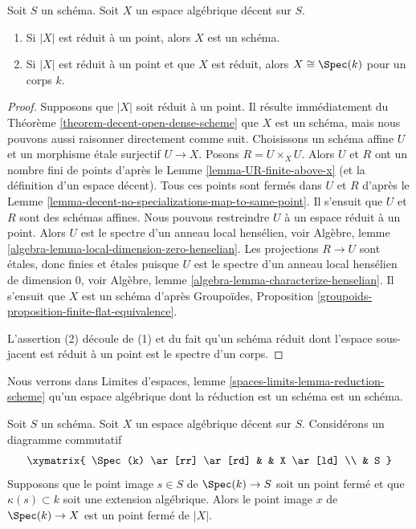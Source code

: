 \begin{lemma}
\label{lemma-when-field}
Soit $S$ un schéma. Soit $X$ un espace algébrique décent sur $S$.
\begin{enumerate}
\item Si $|X|$ est réduit à un point, alors $X$ est un schéma.
\item Si $|X|$ est réduit à un point et que $X$ est réduit, alors
$X \cong \Spec(k)$ pour un corps $k$.
\end{enumerate}
\end{lemma}

\begin{proof}
Supposons que $|X|$ soit réduit à un point. Il résulte immédiatement du
Théorème \ref{theorem-decent-open-dense-scheme} que $X$ est un schéma,
mais nous pouvons aussi raisonner directement comme suit.
Choisissons un schéma affine $U$ et un morphisme étale surjectif $U \to X$.
Posons $R = U \times_X U$. Alors $U$ et $R$ ont un nombre fini de points
d'après le Lemme \ref{lemma-UR-finite-above-x} (et la définition d'un espace
décent). Tous ces points sont fermés dans $U$ et $R$ d'après le
Lemme \ref{lemma-decent-no-specializations-map-to-same-point}.
Il s'ensuit que $U$ et $R$ sont des schémas affines.
Nous pouvons restreindre $U$ à un espace réduit à un point. Alors $U$ est
le spectre d'un anneau local hensélien, voir
Algèbre, lemme \ref{algebra-lemma-local-dimension-zero-henselian}.
Les projections $R \to U$ sont étales, donc finies et étales puisque
$U$ est le spectre d'un anneau local hensélien de dimension $0$, voir
Algèbre, lemme \ref{algebra-lemma-characterize-henselian}.
Il s'ensuit que $X$ est un schéma d'après
Groupoïdes, Proposition \ref{groupoids-proposition-finite-flat-equivalence}.

\medskip\noindent
L'assertion (2) découle de (1) et du fait qu'un schéma réduit dont l'espace
sous-jacent est réduit à un point est le spectre d'un corps.
\end{proof}

\begin{remark}
\label{remark-one-point-decent-scheme}
Nous verrons dans
Limites d'espaces, lemme \ref{spaces-limits-lemma-reduction-scheme}
qu'un espace algébrique dont la réduction est un schéma est un schéma.
\end{remark}

\begin{lemma}
\label{lemma-algebraic-residue-field-extension-closed-point}
Soit $S$ un schéma. Soit $X$ un espace algébrique décent sur $S$.
Considérons un diagramme commutatif
$$
\xymatrix{
\Spec(k) \ar[rr] \ar[rd] & & X \ar[ld] \\
& S
}
$$
Supposons que le point image $s \in S$ de $\Spec(k) \to S$ soit un point
fermé et que $\kappa(s) \subset k$ soit une extension algébrique.
Alors le point image $x$ de $\Spec(k) \to X$ est un point fermé de $|X|$.
\end{lemma}

